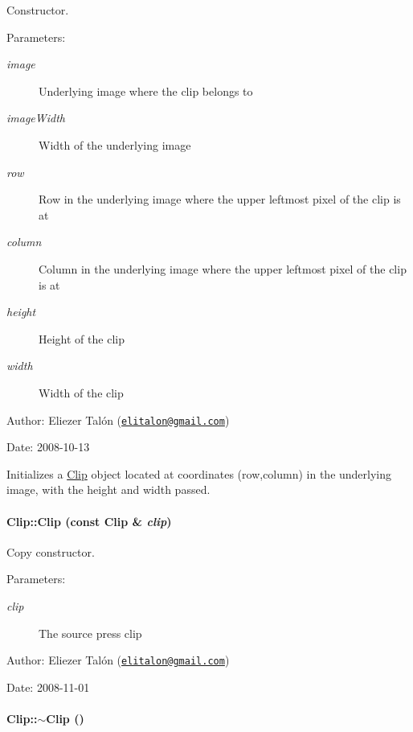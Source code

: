 Constructor. 

\begin{Desc}
\item[Parameters:]
\begin{description}
\item[{\em image}]Underlying image where the clip belongs to \item[{\em imageWidth}]Width of the underlying image \item[{\em row}]Row in the underlying image where the upper leftmost pixel of the clip is at \item[{\em column}]Column in the underlying image where the upper leftmost pixel of the clip is at \item[{\em height}]Height of the clip \item[{\em width}]Width of the clip\end{description}
\end{Desc}
\begin{Desc}
\item[Author:]Eliezer Talón (\href{mailto:elitalon@gmail.com}{\tt elitalon@gmail.com}) \end{Desc}
\begin{Desc}
\item[Date:]2008-10-13\end{Desc}
Initializes a \hyperlink{class_clip}{Clip} object located at coordinates (row,column) in the underlying image, with the height and width passed. \hypertarget{class_clip_affe2f754bd92ded1959f4a7f79d1717}{
\paragraph[{Clip}]{\setlength{\rightskip}{0pt plus 5cm}Clip::Clip (const {\bf Clip} \& {\em clip})}\hfill}
\label{class_clip_affe2f754bd92ded1959f4a7f79d1717}


Copy constructor. 

\begin{Desc}
\item[Parameters:]
\begin{description}
\item[{\em clip}]The source press clip\end{description}
\end{Desc}
\begin{Desc}
\item[Author:]Eliezer Talón (\href{mailto:elitalon@gmail.com}{\tt elitalon@gmail.com}) \end{Desc}
\begin{Desc}
\item[Date:]2008-11-01 \end{Desc}
\hypertarget{class_clip_88647ed65e3482b5e0533ec98667b0fa}{
\paragraph[{$\sim$Clip}]{\setlength{\rightskip}{0pt plus 5cm}Clip::$\sim$Clip ()}\hfill}
\label{class_clip_88647ed65e3482b5e0533ec98667b0fa}


